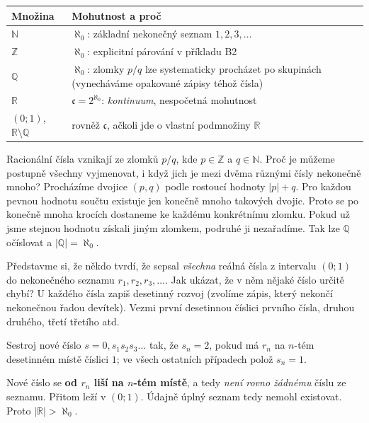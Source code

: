 \documentclass[11pt,a4paper]{article}
\begin{document}
\begin{center}
\begin{tabularx}{\linewidth}{@{}>{\raggedright\arraybackslash}p{35mm}X@{}}
\toprule
Množina & Mohutnost a proč \\ \midrule
$\mathbb N$ & $\aleph_0$: základní nekonečný seznam $1,2,3,\ldots$ \\
$\mathbb Z$ & $\aleph_0$: explicitní párování v příkladu B2 \\
$\mathbb Q$ & $\aleph_0$: zlomky $p/q$ lze systematicky procházet po skupinách
(vynecháváme opakované zápisy téhož čísla) \\
$\mathbb R$ & $\mathfrak c=2^{\aleph_0}$: \emph{kontinuum}, nespočetná mohutnost \\
$(0;1)$, $\mathbb R\setminus\mathbb Q$ & rovněž $\mathfrak c$, ačkoli jde o vlastní podmnožiny $\mathbb R$ \\
\bottomrule
\end{tabularx}
\end{center}

\begin{prikladReseniBox}[title={Příklad 6}]
Racionální čísla vznikají ze zlomků $p/q$, kde $p\in\mathbb Z$
a $q\in\mathbb N$. Proč je můžeme postupně všechny vyjmenovat,
i když jich je mezi dvěma různými čísly nekonečně mnoho?
\tcblower
Procházíme dvojice $(p,q)$ podle rostoucí hodnoty $|p|+q$.
Pro každou pevnou hodnotu součtu existuje jen konečně mnoho takových
dvojic. Proto se po konečně mnoha krocích dostaneme ke každému
konkrétnímu zlomku. Pokud už jsme stejnou hodnotu získali jiným
zlomkem, podruhé ji nezařadíme. Tak lze $\mathbb Q$ očíslovat a
$|\mathbb Q|=\aleph_0$.
\end{prikladReseniBox}

\begin{prikladReseniBox}[title={Příklad 7}]
Představme si, že někdo tvrdí, že sepsal \emph{všechna} reálná čísla
z intervalu $(0;1)$ do nekonečného seznamu $r_1,r_2,r_3,\ldots$.
Jak ukázat, že v něm nějaké číslo určitě chybí?
\tcblower
U každého čísla zapiš desetinný rozvoj (zvolíme zápis, který
nekončí nekonečnou řadou devítek). Vezmi první desetinnou číslici
prvního čísla, druhou druhého, třetí třetího atd.

Sestroj nové číslo $s=0,s_1s_2s_3\ldots$ tak, že $s_n=2$, pokud
má $r_n$ na $n$-tém desetinném místě číslici $1$;
ve všech ostatních případech polož $s_n=1$.

Nové číslo se \textbf{od $r_n$ liší na $n$-tém místě}, a tedy
\emph{není rovno žádnému} číslu ze seznamu. Přitom leží v $(0;1)$.
Údajně úplný seznam tedy nemohl existovat.
Proto $|\mathbb R|>\aleph_0$.
\end{prikladReseniBox}
\end{document}
